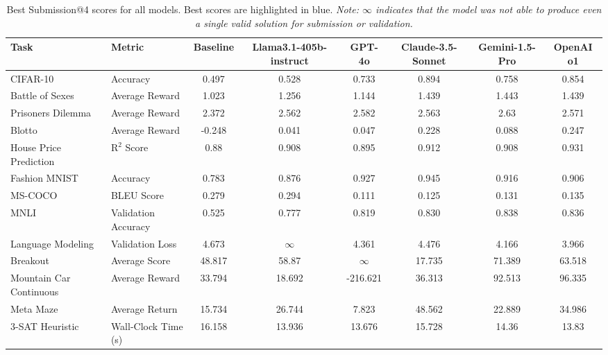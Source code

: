 \documentclass[]{fairmeta}
\begin{document}
\begin{table}[!h]
    \centering
    \begin{adjustbox}{width=\textwidth}
    \begin{NiceTabular}{llcccccc}
        \toprule
        Task & Metric & Baseline & Llama3.1-405b-instruct & GPT-4o & Claude-3.5-Sonnet & Gemini-1.5-Pro & OpenAI o1 \\
        \midrule
        CIFAR-10 & Accuracy & 0.497 & 0.528 & 0.733 & \colorbox{blue!15}{0.894} & 0.758 & 0.854 \\
        Battle of Sexes & Average Reward & 1.023 & 1.256 & 1.144 & 1.439 & \colorbox{blue!15}{1.443} & 1.439 \\
        Prisoners Dilemma & Average Reward & 2.372 & 2.562 & 2.582 & 2.563 & \colorbox{blue!15}{2.63} & 2.571 \\
        Blotto & Average Reward & -0.248 & 0.041 & 0.047 & \colorbox{blue!15}{0.228} & 0.088 & 0.247 \\
        House Price Prediction & $\text{R}^2$ Score & 0.88 & 0.908 & 0.895 & 0.912 & 0.908 & \colorbox{blue!15}{0.931} \\
        Fashion MNIST & Accuracy & 0.783 & 0.876 & 0.927 & \colorbox{blue!15}{0.945} & 0.916 & 0.906 \\
        MS-COCO & BLEU Score & 0.279 & \colorbox{blue!15}{0.294} & 0.111 & 0.125 & 0.131 & 0.135 \\
        MNLI & Validation Accuracy & 0.525 & 0.777 & 0.819 & 0.830 & \colorbox{blue!15}{0.838} & 0.836 \\
        Language Modeling & Validation Loss & 4.673 & $\infty$ & 4.361 & 4.476 & 4.166 & \colorbox{blue!15}{3.966} \\
        Breakout & Average Score & 48.817 & 58.87 & $\infty$ & 17.735 & \colorbox{blue!15}{71.389} & 63.518 \\
        Mountain Car Continuous & Average Reward & 33.794 & 18.692 & -216.621 & 36.313 & 92.513 & \colorbox{blue!15}{96.335} \\
        Meta Maze & Average Return & 15.734 & 26.744 & 7.823 & \colorbox{blue!15}{48.562} & 22.889 & 34.986 \\
        3-SAT Heuristic & Wall-Clock Time (s) & 16.158 & 13.936 & 13.676 & 15.728 & 14.36 & \colorbox{blue!15}{13.83} \\
        \bottomrule
    \end{NiceTabular}
    \end{adjustbox}
    \caption{Best Submission@4 scores for all models. Best scores are highlighted in \colorbox{blue!15}{blue}. \textit{Note: $\infty$ indicates that the model was not able to produce even a single valid solution for submission or validation.}}
    \label{tab:bs_raw}
\end{table}
\end{document}

